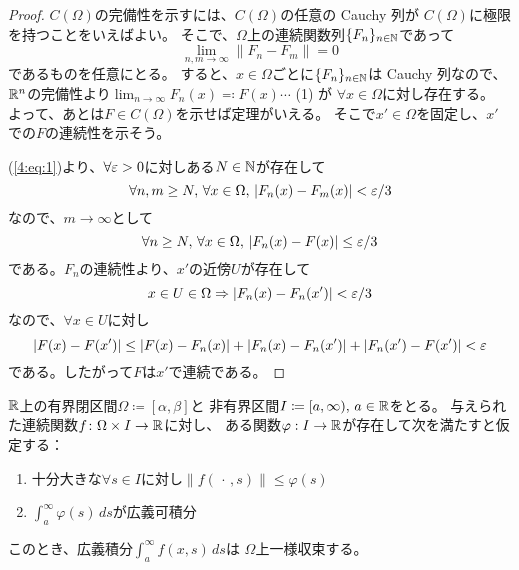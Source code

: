 \documentclass[report]{jlreq}
\begin{document}
\begin{proof}
    $C(\Omega)$の完備性を示すには、$C(\Omega)$の任意の Cauchy 列が
    $C(\Omega)$に極限を持つことをいえばよい。
    そこで、$\Omega$上の連続関数列$\{ F_n \}_{n \in \mathbb{N}}$であって
    \begin{equation}
        \lim_{n, m \to \infty} \| F_n - F_m \| = 0
        \label{4:eq:1}
    \end{equation}
    であるものを任意にとる。
    すると、$x \in \Omega$ごとに$\{ F_n \}_{n \in \mathbb{N}}$は Cauchy 列なので、
    $\mathbb{R}^n$の完備性より$\lim_{n \to \infty} F_n(x) \eqqcolon F(x) \cdots$ (1) が
    $\forall x \in \Omega$に対し存在する。
    よって、あとは$F \in C(\Omega)$を示せば定理がいえる。
    そこで$x' \in \Omega$を固定し、$x'$での$F$の連続性を示そう。

    (\ref{4:eq:1})より、$\forall \varepsilon > 0$に対しある$N \in \mathbb{N}$が存在して
    \begin{equation}
        \forall n, m \ge N,\, \forall x \in \Omega,\, |F_n(x) - F_m(x)| < \varepsilon / 3
    \end{equation}
    なので、$m \to \infty$として
    \begin{equation}
        \forall n \ge N,\, \forall x \in \Omega,\, |F_n(x) - F(x)| \le \varepsilon / 3
    \end{equation}
    である。$F_n$の連続性より、$x'$の近傍$U$が存在して
    \begin{equation}
        x \in U \in \Omega \Rightarrow |F_n(x) - F_n(x')| < \varepsilon / 3
    \end{equation}
    なので、$\forall x \in U$に対し
    \begin{equation}
        |F(x) - F(x')|
            \le |F(x) - F_n(x)| + |F_n(x) - F_n(x')| + |F_n(x') - F(x')| < \varepsilon
    \end{equation}
    である。したがって$F$は$x'$で連続である。
\end{proof}

\begin{theorem}
    $\mathbb{R}$上の有界閉区間$\Omega \coloneq [\alpha, \beta]$と
    非有界区間$I \coloneq [a, \infty),\, a \in \mathbb{R}$をとる。
    与えられた連続関数$f \colon \Omega \times I \to \mathbb{R}$に対し、
    ある関数$\varphi: I \to \mathbb{R}$が存在して次を満たすと仮定する：
    \begin{enumerate}
        \item 十分大きな$\forall s \in I$に対し$\| f(\,\cdot\, , s) \| \le \varphi(s)$
        \item $\int_a^\infty \varphi(s)\, ds$が広義可積分
    \end{enumerate}
    このとき、広義積分$\int_a^\infty f(x, s)\, ds$は
    $\Omega$上一様収束する。
\end{theorem}
\end{document}
